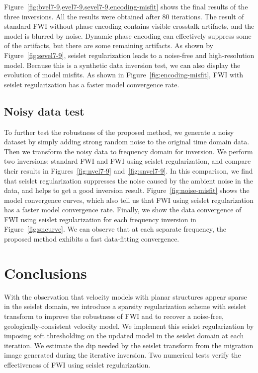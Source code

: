 Figure~\ref{fig:bvel7-9,evel7-9,sevel7-9,encoding-misfit} shows the final results of the three inversions.
All the results were obtained after 80 iterations.
The result of standard FWI without phase encoding contains visible crosstalk artifacts,
and the model is blurred by noise.
Dynamic phase encoding can effectively suppress some of the artifacts, but there are some remaining artifacts.
As shown by Figure~\ref{fig:sevel7-9}, seislet regularization leads to a noise-free and high-resolution model.
Because this is a synthetic data inversion test, we can also display the evolution of model misfits.
As shown in Figure~\ref{fig:encoding-misfit}, FWI with seislet regularization has a faster model convergence rate.

\subsection{Noisy data test}

To further test the robustness of the proposed method, we generate a noisy dataset 
by simply adding strong random noise to the original time domain data.
Then we transform the noisy data to frequency domain for inversion.
We perform two inversions: standard FWI and FWI using seislet regularization,
and compare their results in Figures~\ref{fig:nvel7-9} and~\ref{fig:snvel7-9}.
In this comparison, we find that seislet regularization suppresses the noise caused by the ambient noise in the data,
and helps to get a good inversion result.
Figure~\ref{fig:noise-misfit} shows the model convergence curves, which also tell us that 
FWI using seislet regularization has a faster model convergence rate.
Finally, we show the data convergence of FWI using seislet regularization for each frequency inversion in Figure~\ref{fig:sncurve}.
We can observe that at each separate frequency, the proposed method exhibits a fast data-fitting convergence.

\section{Conclusions}
With the observation that velocity models with planar structures appear sparse in the seislet domain,
we introduce a sparsity regularization scheme with seislet transform to improve the robustness of FWI 
and to recover a noise-free, geologically-consistent velocity model.
We implement this seislet regularization by imposing soft thresholding on the updated model in the seislet domain at each iteration.
We estimate the dip needed by the seislet transform from the migration image generated during the iterative inversion.
Two numerical tests verify the effectiveness of FWI using seislet regularization.

